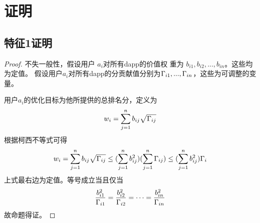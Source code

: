 \section{证明}
\subsection{特征1证明}
\label{subsection:proof1}
\begin{proof}

不失一般性，假设用户 $a_i$对所有dapp的价值权
重为 $b_{i1}, b_{i2}, ..., b_{in}$。这些均为定值。
假设用户$a_i$对所有dapp的分贡献值分别为$\Gamma_{i1},...,\Gamma_{in}$，这些为可调整的变量。

用户$a_i$的优化目标为他所提供的总排名分，定义为
$$w_i = \sum_{j=1}^n b_{ij}\sqrt{\Gamma_{ij}}$$
根据柯西不等式可得
$$w_i = \sum_{j=1}^n b_{ij}\sqrt{\Gamma_{ij}} \leq (\sum_{j=1}^n b_{ij}^2)(\sum_{j=1}^n \Gamma_{ij}) \leq (\sum_{j=1}^n b_{ij}^2)\Gamma_i$$
上式最右边为定值。等号成立当且仅当
$$\frac{b_{i1}^2}{\Gamma_{i1}}=\frac{b_{i2}^2}{\Gamma_{i2}}=\cdots=\frac{b_{in}^2}{\Gamma_{in}}$$
故命题得证。

\end{proof}
